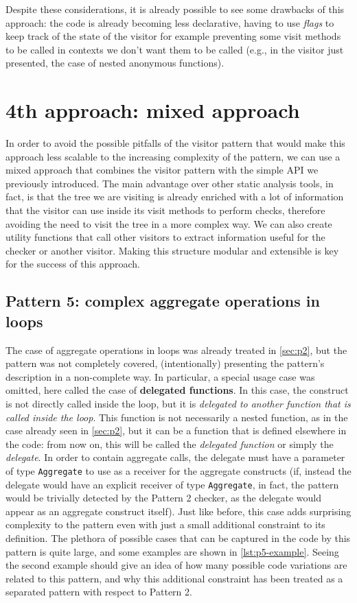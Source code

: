\documentclass[12pt,a4paper,openright,twoside]{book}
\begin{document}
Despite these considerations, it is already possible to see some drawbacks of
this approach: the code is already becoming less declarative, having to use
\emph{flags} to keep track of the state of the visitor for example preventing
some visit methods to be called in contexts we don't want them to be called
(e.g., in the visitor just presented, the case of nested anonymous functions). 

\section{4th approach: mixed approach}

In order to avoid the possible pitfalls of the visitor pattern that would make
this approach less scalable to the increasing complexity of the pattern, we can
use a mixed approach that combines the visitor pattern with the simple API we
previously introduced. The main advantage over other static analysis tools, in
fact, is that the tree we are visiting is already enriched with a lot of
information that the visitor can use inside its visit methods to perform checks,
therefore avoiding the need to visit the tree in a more complex way.
%
We can also create utility functions that call other visitors to extract
information useful for the checker or another visitor. Making this structure 
modular and extensible is key for the success of this approach.

\subsection{Pattern 5: complex aggregate operations in loops} \label{sec:p5}

The case of aggregate operations in loops was already treated in \cref{sec:p2},
but the pattern was not completely covered, (intentionally) presenting the
pattern's description in a non-complete way. In particular, a special usage
case was omitted, here called the case of \textbf{delegated functions}. 
%
In this case, the construct is not directly called inside the loop, but it is
\emph{delegated to another function that is called inside the loop}. This
function is not necessarily a nested function, as in the case already seen in
\cref{sec:p2}, but it can be a function that is defined elsewhere in the code:
from now on, this will be called the \emph{delegated function} or simply the
\emph{delegate}. In order to contain aggregate calls, the delegate must have a
parameter of type \lstinline{Aggregate} to use as a receiver for the aggregate
constructs (if, instead the delegate would have an explicit receiver of type
\lstinline{Aggregate}, in fact, the pattern would be trivially detected by the
Pattern 2 checker, as the delegate would appear as an aggregate construct
itself).
%
Just like before, this case adds surprising complexity to the pattern even with
just a small additional constraint to its definition. The plethora of possible
cases that can be captured in the code by this pattern is quite large, and some
examples are shown in \cref{lst:p5-example}. Seeing the second example should
give an idea of how many possible code variations are related to this pattern,
and why this additional constraint has been treated as a separated pattern with
respect to Pattern 2.
\end{document}
